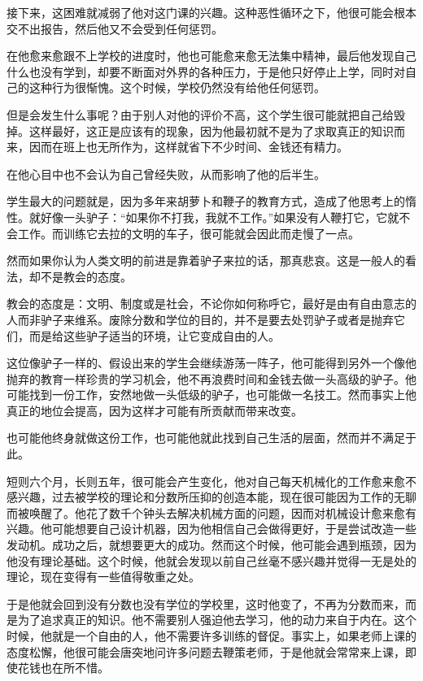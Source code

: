 \documentclass[UTF8]{article}
\begin{document}
\par 接下来，这困难就减弱了他对这门课的兴趣。这种恶性循环之下，他很可能会根本交不出报告，然后他又不会受到任何惩罚。
\par 在他愈来愈跟不上学校的进度时，他也可能愈来愈无法集中精神，最后他发现自己什么也没有学到，却要不断面对外界的各种压力，于是他只好停止上学，同时对自己的这种行为很惭愧。这个时候，学校仍然没有给他任何惩罚。
\par 但是会发生什么事呢？由于别人对他的评价不高，这个学生很可能就把自己给毁掉。这样最好，这正是应该有的现象，因为他最初就不是为了求取真正的知识而来，因而在班上也无所作为，这样就省下不少时间、金钱还有精力。
\par 在他心目中也不会认为自己曾经失败，从而影响了他的后半生。
\par 学生最大的问题就是，因为多年来胡萝卜和鞭子的教育方式，造成了他思考上的惰性。就好像一头驴子：“如果你不打我，我就不工作。”如果没有人鞭打它，它就不会工作。而训练它去拉的文明的车子，很可能就会因此而走慢了一点。
\par 然而如果你认为人类文明的前进是靠着驴子来拉的话，那真悲哀。这是一般人的看法，却不是教会的态度。
\par 教会的态度是：文明、制度或是社会，不论你如何称呼它，最好是由有自由意志的人而非驴子来维系。废除分数和学位的目的，并不是要去处罚驴子或者是抛弃它们，而是给这些驴子适当的环境，让它变成自由的人。
\par 这位像驴子一样的、假设出来的学生会继续游荡一阵子，他可能得到另外一个像他抛弃的教育一样珍贵的学习机会，他不再浪费时间和金钱去做一头高级的驴子。他可能找到一份工作，安然地做一头低级的驴子，也可能做一名技工。然而事实上他真正的地位会提高，因为这样才可能有所贡献而带来改变。
\par 也可能他终身就做这份工作，也可能他就此找到自己生活的层面，然而并不满足于此。
\par 短则六个月，长则五年，很可能会产生变化，他对自己每天机械化的工作愈来愈不感兴趣，过去被学校的理论和分数所压抑的创造本能，现在很可能因为工作的无聊而被唤醒了。他花了数千个钟头去解决机械方面的问题，因而对机械设计愈来愈有兴趣。他可能想要自己设计机器，因为他相信自己会做得更好，于是尝试改造一些发动机。成功之后，就想要更大的成功。然而这个时候，他可能会遇到瓶颈，因为他没有理论基础。这个时候，他就会发现以前自己丝毫不感兴趣并觉得一无是处的理论，现在变得有一些值得敬重之处。
\par 于是他就会回到没有分数也没有学位的学校里，这时他变了，不再为分数而来，而是为了追求真正的知识。他不需要别人强迫他去学习，他的动力来自于内在。这个时候，他就是一个自由的人，他不需要许多训练的督促。事实上，如果老师上课的态度松懈，他很可能会唐突地问许多问题去鞭策老师，于是他就会常常来上课，即使花钱也在所不惜。
\end{document}

